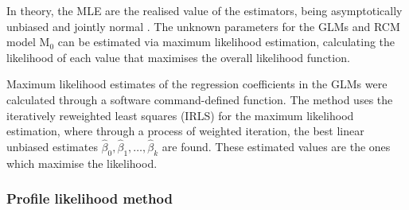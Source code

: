 In theory, the MLE are the realised value of the estimators, being asymptotically unbiased and jointly normal \cite{casella2002statistical}.
The unknown parameters for the GLMs and RCM model M$_0$ can be estimated via maximum likelihood estimation, calculating the likelihood of each value that maximises the overall likelihood function.

Maximum likelihood estimates of the regression coefficients in the GLMs were calculated through a software command-defined function.
The method uses the iteratively reweighted least squares (IRLS) for the maximum likelihood estimation, where through a process of weighted iteration, the best linear unbiased estimates $\widehat{\beta}_0,\widehat{\beta}_1,\dots,\widehat{\beta}_k$ are found.
These estimated values are the ones which maximise the likelihood.



\subsubsection{Profile likelihood method}

